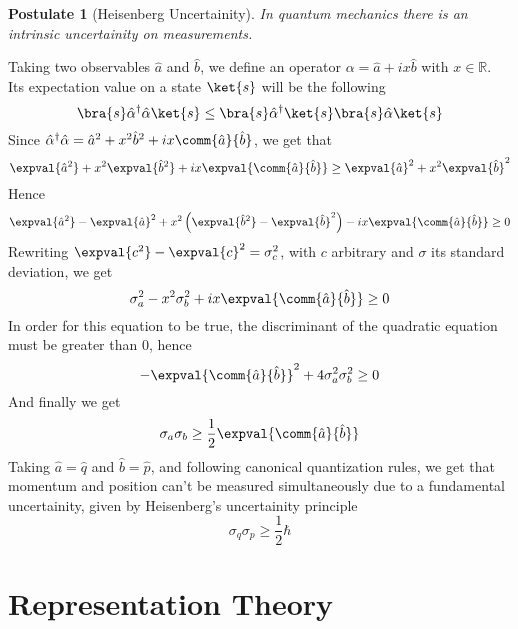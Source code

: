 \documentclass[a4paper, 11pt]{book}
\newcommand{\1}{\opr{\mathds{1}}}
\newcommand{\opr}[1]{\hat{#1}}
\newcommand{\adj}[2][]{#2^{\dagger#1}}
\newtheorem{pos}{Postulate}
\theoremstyle{plain}
\begin{document}
	\begin{pos}[Heisenberg Uncertainity]
		In quantum mechanics there is an intrinsic uncertainity on measurements.
	\end{pos}
		Taking two observables $\opr{a}$ and $\opr{b}$, we define an operator $\alpha=\opr{a}+ix\opr{b}$ with $x\in\mathbb{R}$.\\
		Its expectation value on a state $\ket{s}$ will be the following
		\begin{equation*}
			\bra{s}\adj{\opr{\alpha}}\opr{\alpha}\ket{s}\le\bra{s}\adj{\opr{\alpha}}\ket{s}\bra{s}\opr{\alpha}\ket{s}
		\end{equation*}
		Since $\adj{\opr{\alpha}}\opr{\alpha}=\opr{a}^2+x^2\opr{b}^2+ix\comm{\opr{a}}{\opr{b}}$, we get that
		\begin{equation*}
			\expval{\opr{a}^2}+x^2\expval{\opr{b}^2}+ix\expval{\comm{\opr{a}}{\opr{b}}}\ge\expval{\opr{a}}^2+x^2\expval{\opr{b}}^2
		\end{equation*}
		Hence
		\begin{equation*}
			\expval{\opr{a}^2}-\expval{\opr{a}}^2+x^2\left( \expval{\opr{b}^2}-\expval{\opr{b}}^2 \right)-ix\expval{\comm{\opr{a}}{\opr{b}}}\ge0
		\end{equation*}
		Rewriting $\expval{c^2}-\expval{c}^2=\sigma_c^2$, with $c$ arbitrary and $\sigma$ its standard deviation, we get
		\begin{equation*}
			\sigma_a^2-x^2\sigma_b^2+ix\expval{\comm{\opr{a}}{\opr{b}}}\ge0
		\end{equation*}
		In order for this equation to be true, the discriminant of the quadratic equation must be greater than $0$, hence
		\begin{equation*}
			-\expval{\comm{\opr{a}}{\opr{b}}}^2+4\sigma_a^2\sigma_b^2\ge0
		\end{equation*}
		And finally we get
		\begin{equation*}
			\sigma_a\sigma_b\ge\frac{1}{2}\expval{\comm{\opr{a}}{\opr{b}}}
		\end{equation*}
		Taking $\opr{a}=\opr{q}$ and $\opr{b}=\opr{p}$, and following canonical quantization rules, we get that momentum and position can't be measured simultaneously due to a fundamental uncertainity, given by Heisenberg's uncertainity principle
		\begin{equation}
			\sigma_q\sigma_p\ge\frac{1}{2}\hbar
			\label{eq:heisenberguncqp}
		\end{equation}
	\section{Representation Theory}
\end{document}
